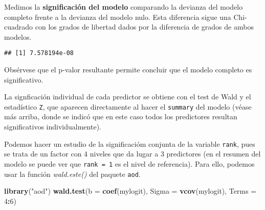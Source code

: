 \documentclass[
]{article}
\newenvironment{Shaded}{\begin{snugshade}}{\end{snugshade}}
\newcommand{\AttributeTok}[1]{\textcolor[rgb]{0.13,0.29,0.53}{#1}}
\newcommand{\ConstantTok}[1]{\textcolor[rgb]{0.56,0.35,0.01}{#1}}
\newcommand{\DecValTok}[1]{\textcolor[rgb]{0.00,0.00,0.81}{#1}}
\newcommand{\FunctionTok}[1]{\textcolor[rgb]{0.13,0.29,0.53}{\textbf{#1}}}
\newcommand{\NormalTok}[1]{#1}
\newcommand{\OtherTok}[1]{\textcolor[rgb]{0.56,0.35,0.01}{#1}}
\newcommand{\SpecialCharTok}[1]{\textcolor[rgb]{0.81,0.36,0.00}{\textbf{#1}}}
\newcommand{\StringTok}[1]{\textcolor[rgb]{0.31,0.60,0.02}{#1}}
\begin{document}
Medimos la \textbf{significación del modelo} comparando la devianza del
modelo completo frente a la devianza del modelo nulo. Esta diferencia
sigue una Chi-cuadrado con los grados de libertad dados por la
diferencia de grados de ambos modelos.

\begin{Shaded}
\end{Shaded}

\begin{verbatim}
## [1] 7.578194e-08
\end{verbatim}

Obsérvese que el p-valor resultante permite concluir que el modelo
completo es significativo.

La signficación individual de cada predictor se obtiene con el test de
Wald y el estadístico \texttt{Z}, que aparecen directamente al hacer el
\texttt{summary} del modelo (véase más arriba, donde se indicó que en
este caso todos los predictores resultan significativos
individualmente).

Podemos hacer un estudio de la significacióm conjunta de la variable
\texttt{rank}, pues se trata de un factor con 4 niveles que da lugar a 3
predictores (en el resumen del modelo se puede ver que
\texttt{rank\ =\ 1} es el nivel de referencia). Para ello, podemos usar
la función \emph{wald.este()} del paquete \texttt{aod}.

\begin{Shaded}
\begin{Highlighting}[]
\FunctionTok{library}\NormalTok{(}\StringTok{"aod"}\NormalTok{)}
\FunctionTok{wald.test}\NormalTok{(}\AttributeTok{b =} \FunctionTok{coef}\NormalTok{(mylogit), }\AttributeTok{Sigma =} \FunctionTok{vcov}\NormalTok{(mylogit), }\AttributeTok{Terms =} \DecValTok{4}\SpecialCharTok{:}\DecValTok{6}\NormalTok{) }
\end{Highlighting}
\end{Shaded}
\end{document}
